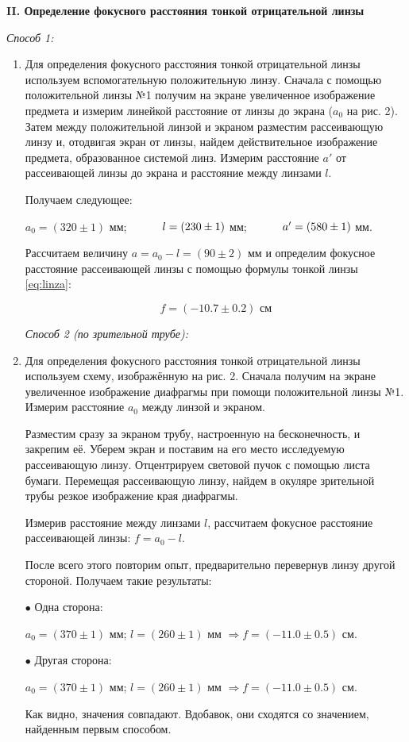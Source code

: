 \documentclass[12pt,a4paper]{article}
\begin{document}
	\begin{center}
		\textbf{II. Определение фокусного расстояния тонкой отрицательной линзы}
	\end{center}
	\textit{Способ 1:} 
	\begin{enumerate}
		\item Для определения фокусного расстояния тонкой отрицательной линзы используем вспомогательную положительную линзу. Сначала с помощью положительной линзы №1 получим на экране увеличенное изображение предмета и измерим линейкой расстояние от линзы до экрана ($a_0$ на рис. 2). Затем между положительной линзой и экраном разместим рассеивающую линзу и, отодвигая экран от линзы, найдем действительное изображение предмета, образованное системой линз. Измерим расстояние $a'$ от рассеивающей линзы до экрана и расстояние между линзами $l$.
		
		Получаем следующее:
		
		$a_0 = (320 \pm 1)$ мм;	 $\hspace{10mm} l = (230 \pm 1)$ мм;  $\hspace{10mm} a' = (580 \pm 1)$ мм.
		
		
		Рассчитаем величину $a = a_0 - l = (90 \pm 2)$ мм и определим фокусное расстояние рассеивающей линзы с помощью формулы тонкой линзы \ref{eq:linza}:
		
		\begin{equation*}
			\boxed{f = (-10.7 \pm 0.2) \text{ см}}
		\end{equation*}
	
	\textit{Способ 2 (по зрительной трубе):}
	
	\item Для определения фокусного расстояния тонкой отрицательной линзы используем схему, изображённую на рис. 2. Сначала получим на экране увеличенное изображение диафрагмы при помощи положительной линзы №1. Измерим расстояние $a_0$ между линзой и экраном.
	
	Разместим сразу за экраном трубу, настроенную на бесконечность, и закрепим её. Уберем экран и поставим на его место исследуемую рассеивающую линзу. Отцентрируем световой пучок с помощью листа бумаги. Перемещая рассеивающую линзу, найдем в окуляре зрительной трубы резкое изображение края диафрагмы.
	
	Измерив расстояние между линзами $l$, рассчитаем фокусное расстояние рассеивающей линзы: $f = a_0 - l$.
	
	После всего этого повторим опыт, предварительно перевернув линзу другой стороной. Получаем такие результаты:
	
	$\bullet$ Одна сторона: 
	
	$a_0 = (370 \pm 1)$ мм; $l = (260 \pm 1)$ мм $\Longrightarrow f = (-11.0 \pm 0.5)$ см.
	
	$\bullet$ Другая сторона:
	
	$a_0 = (370 \pm 1)$ мм; $l = (260 \pm 1)$ мм $\Longrightarrow f = (-11.0 \pm 0.5)$ см.
	

	\vspace{5mm}	
	Как видно, значения совпадают. Вдобавок, они сходятся со значением, найденным первым способом.
	\end{enumerate}
\end{document}
